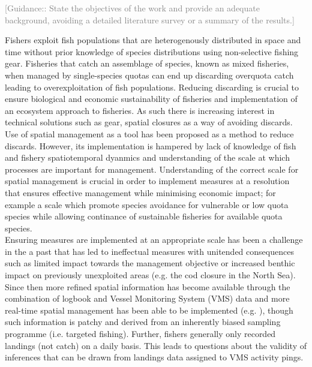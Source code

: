 \documentclass[review]{elsarticle}
\begin{document}
\textcolor{gray}{[Guidance:: State the objectives of the work and provide an 
adequate background, avoiding a detailed literature survey or a summary of the
results.] \\}

Fishers exploit fish populations that are heterogenously distributed in space
and time without prior knowledge of species distributions using non-selective
fishing gear. Fisheries that catch an assemblage of species, known as mixed
fisheries, when managed by single-species quotas can end up discarding
overquota catch leading to overexploitation of fish populations. Reducing
discarding is crucial to ensure biological and economic sustainability of
fisheries and implementation of an ecosystem approach to fisheries. As such
there is increasing interest in technical solutions such as gear, spatial
closures as a way of avoiding discards.  \\

Use of spatial management as a tool has been proposed as a method to reduce
discards. However, its implementation is hampered by lack of knowledge of fish
and fishery spatiotemporal dyanmics and understanding of the scale at which
processes are important for management. Understanding of the correct scale for
spatial management is crucial in order to implement measures at a resolution
that ensures effective management\cite{Dunn2016} while minimising economic
impact; for example a scale which promote species avoidance for vulnerable or
low quota species while allowing continance of sustainable fisheries for
available quota species. \\

Ensuring measures are implemented at an appropriate scale has been a challenge
in the a past that has led to ineffectual measures with unitended consequences
such as limited impact towards the management objective or increased benthic
impact on previously unexploited areas (e.g. the cod closure in the North
Sea\cite{Rijnsdorp2001,Dinmore2003}). Since then more refined spatial
information has become available through the combination of logbook and Vessel
Monitoring System (VMS) data\cite{Lee2010, Bastardie2010, Gerritsen2012,
	Mateo2016} and more real-time spatial management has been able to be
implemented (e.g. \cite{Holmes2011}), though such information is patchy and
derived from an inherently biased sampling programme (i.e. targeted fishing).
Further, fishers generally only recorded landings (not catch) on a daily basis.
This leads to questions about the validity of inferences that can be drawn from
landings data assigned to VMS activity pings. \\ 
\end{document}
